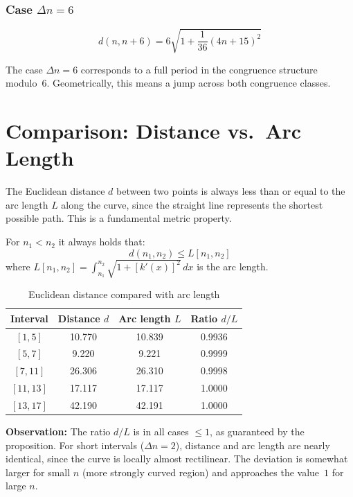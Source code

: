 \subsubsection{Case $\Delta n = 6$}

\begin{equation}
d(n, n+6) = 6\sqrt{1 + \frac{1}{36}(4n + 15)^2}
\end{equation}

\begin{remark}
The case $\Delta n = 6$ corresponds to a full period in the congruence
structure modulo~$6$. Geometrically, this means a jump across both
congruence classes.
\end{remark}

\section{Comparison: Distance vs.\ Arc Length}

The Euclidean distance $d$ between two points is always less than or equal to
the arc length $L$ along the curve, since the straight line represents the
shortest possible path. This is a fundamental metric property.

\begin{proposition}
For $n_1 < n_2$ it always holds that:
\begin{equation}
d(n_1, n_2) \leq L[n_1, n_2]
\end{equation}
where $L[n_1, n_2] = \int_{n_1}^{n_2} \sqrt{1 + [k'(x)]^2}\, dx$ is the arc length.
\end{proposition}

\begin{example}
\begin{table}[H]
\centering
\caption{Euclidean distance compared with arc length}
\begin{tabular}{cccc}
\toprule
Interval & Distance $d$ & Arc length $L$ & Ratio $d/L$ \\
\midrule
$[1, 5]$   & 10.770 & 10.839 & 0.9936 \\
$[5, 7]$   & 9.220  & 9.221  & 0.9999 \\
$[7, 11]$  & 26.306 & 26.310 & 0.9998 \\
$[11, 13]$ & 17.117 & 17.117 & 1.0000 \\
$[13, 17]$ & 42.190 & 42.191 & 1.0000 \\
\bottomrule
\end{tabular}
\end{table}

\textbf{Observation:} The ratio $d/L$ is in all cases $\leq 1$, as
guaranteed by the proposition. For short intervals ($\Delta n = 2$), distance
and arc length are nearly identical, since the curve is locally almost
rectilinear. The deviation is somewhat larger for small $n$ (more strongly
curved region) and approaches the value~$1$ for large $n$.
\end{example}

